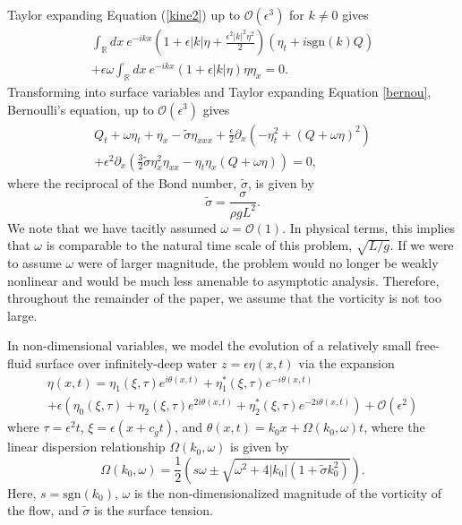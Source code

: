 \documentclass[a4paper,11pt]{article}
\newcommand{\pd}{\partial}
\begin{document}
Taylor expanding Equation (\ref{kine2}) up to $\mathcal{O}(\epsilon^3)$ for $k\neq 0$ gives
\begin{multline}
\int_{\mathbb{R}}dx~e^{-ikx}\left(1 + \epsilon |k|\eta + \frac{\epsilon^{2}|k|^{2}\eta^{2}}{2} \right)\left(\eta_{t} + i \mbox{sgn}(k)Q \right) \\
+ \epsilon \omega \int_{\mathbb{R}}dx~e^{-ikx}\left(1 + \epsilon |k|\eta \right) \eta \eta_{x} = 0.
\label{integro1}
\end{multline}
Transforming into surface variables and Taylor expanding Equation \eqref{bernou}, Bernoulli's equation, up to $\mathcal{O}(\epsilon^3)$ gives
\begin{multline}
Q_{t} + \omega \eta_{t} + \eta_{x} - \tilde{\sigma}\eta_{xxx} + \frac{\epsilon}{2}\pd_{x}\left(-\eta_{t}^{2} + (Q+\omega \eta)^{2} \right)\\
+ \epsilon^{2}\pd_{x}\left( \frac{3}{2}\tilde{\sigma}\eta_{x}^{2}\eta_{xx} - \eta_{t}\eta_{x} \left(Q  + \omega \eta \right) \right)  = 0,
\label{berexp}
\end{multline}
where the reciprocal of the Bond number, $\tilde{\sigma}$, is given by
\[
\tilde{\sigma} = \frac{\sigma}{\rho g L^2}.
\]
We note that we have tacitly assumed $\omega = \mathcal{O}(1)$.  In physical terms, this implies that $\omega$ is comparable to the natural time scale of this problem, $\sqrt{L/g}$.  If we were to assume $\omega$ were of larger magnitude, the problem would no longer be weakly nonlinear and would be much less amenable to asymptotic analysis.  Therefore, throughout the remainder of the paper, we assume that the vorticity is not too large.

In non-dimensional variables, we model the evolution of a relatively small free-fluid surface over infinitely-deep water $z=\epsilon \eta(x,t)$ via the expansion 
\begin{multline*}
\eta(x,t) = \eta_{1}(\xi,\tau)e^{i\theta(x,t)} + \eta^{\ast}_{1}(\xi,\tau)e^{-i\theta(x,t)}\\
+ \epsilon\left(\eta_{0}(\xi,\tau) + \eta_{2}(\xi,\tau)e^{2i\theta(x,t)} + \eta^{\ast}_{2}(\xi,\tau)e^{-2i\theta(x,t)}\right) + \mathcal{O}\left(\epsilon^{2} \right)
\end{multline*}
where $\tau = \epsilon^{2}t$, $\xi = \epsilon(x+c_{g}t)$, and $\theta(x,t) = k_{0}x + \Omega(k_{0},\omega)t$, where the linear dispersion relationship $\Omega(k_{0},\omega)$ is given by
\[
\Omega(k_{0},\omega) = \frac{1}{2}\left(s\omega \pm \sqrt{\omega^{2} + 4|k_{0}|\left(1+\tilde{\sigma}k_{0}^{2}\right)} \right).
\]
Here, $s = \mbox{sgn}(k_{0})$, $\omega$ is the non-dimensionalized magnitude of the vorticity of the flow, and $\tilde{\sigma}$ is the surface tension.  
\end{document}
